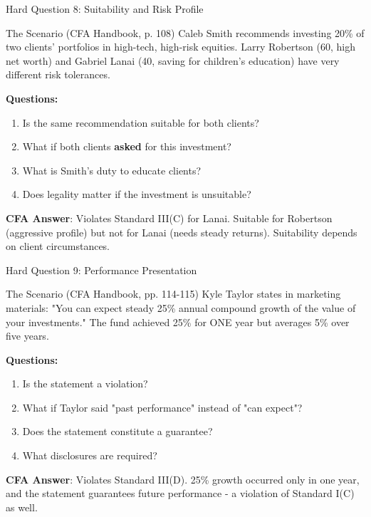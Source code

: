 \documentclass{beamer}
\begin{document}
	\begin{frame}{Hard Question 8: Suitability and Risk Profile}
		\begin{block}{The Scenario (CFA Handbook, p. 108)}
			Caleb Smith recommends investing 20\% of two clients' portfolios in high-tech, high-risk equities. Larry Robertson (60, high net worth) and Gabriel Lanai (40, saving for children's education) have very different risk tolerances.
		\end{block}
		
		\vspace{0.2cm}
		\textbf{Questions:}
		\begin{enumerate}
			\item Is the same recommendation suitable for both clients?
			\item What if both clients \textbf{asked} for this investment?
			\item What is Smith's duty to educate clients?
			\item Does legality matter if the investment is unsuitable?
		\end{enumerate}
		
		\vspace{0.2cm}
		\textcolor{cfablue}{\textbf{CFA Answer}}: Violates Standard III(C) for Lanai. Suitable for Robertson (aggressive profile) but not for Lanai (needs steady returns). Suitability depends on client circumstances.
	\end{frame}
	
	\begin{frame}{Hard Question 9: Performance Presentation}
		\begin{block}{The Scenario (CFA Handbook, pp. 114-115)}
			Kyle Taylor states in marketing materials: "You can expect steady 25\% annual compound growth of the value of your investments." The fund achieved 25\% for ONE year but averages 5\% over five years.
		\end{block}
		
		\vspace{0.2cm}
		\textbf{Questions:}
		\begin{enumerate}
			\item Is the statement a violation?
			\item What if Taylor said "past performance" instead of "can expect"?
			\item Does the statement constitute a guarantee?
			\item What disclosures are required?
		\end{enumerate}
		
		\vspace{0.2cm}
		\textcolor{cfablue}{\textbf{CFA Answer}}: Violates Standard III(D). 25\% growth occurred only in one year, and the statement guarantees future performance - a violation of Standard I(C) as well.
	\end{frame}
	
\end{document}

